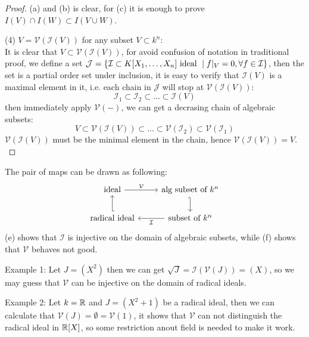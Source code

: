 \begin{proof}
    (a) and (b) is clear, for (c) it is enough to prove \(I(V) \cap I(W) \subset I(V \cup W)\). 

        (4) \(V= \mathcal{V}(\mathcal{I}(V)) \) for any subset \(V \subset k^n\):\\

        It is clear that \(V \subset \mathcal{V}(\mathcal{I}(V))\), for avoid confusion of notation in traditional proof, we define a set \(\mathcal{J}=\{\mathcal{I} \subset K[X_1,\dots,X_n] \\\text{ ideal } \mid f|_V = 0, \forall f \in \mathcal{I}\}\), then the set is a partial order set under inclusion, it is easy to verify that \(\mathcal{I}(V)\) is a maximal element in it, i.e. each chain in \(\mathcal{J}\) will stop at \(\mathcal{V}(\mathcal{I}(V))\):
        \[\mathcal{I}_1 \subset \mathcal{I}_2 \subset \dots \subset \mathcal{I}(V)\]
        then immediately apply \(\mathcal{V}(-)\), we can get a decrasing chain of algebraic subsets:
        \[V \subset \mathcal{V}(\mathcal{I}(V)) \subset \dots \subset \mathcal{V}(\mathcal{I}_2) \subset \mathcal{V}(\mathcal{I}_1)\]
        \(\mathcal{V}(\mathcal{I}(V))\) must be the minimal element in the chain, hence \(\mathcal{V}(\mathcal{I}(V)) = V\).\\
\end{proof}

\begin{remark}
    The pair of maps can be drawn as following:
\[\begin{tikzcd}
	{\text{ideal}} & {\text{alg subset of } k^n} \\
	{\text{radical ideal}} & {\text{subset of } k^n}
	\arrow["{\mathcal{V}}", from=1-1, to=1-2]
	\arrow[hook', from=1-2, to=2-2]
	\arrow[hook', from=2-1, to=1-1]
	\arrow["{\mathcal{I}}", from=2-2, to=2-1]
\end{tikzcd}\]
(e) shows that \(\mathcal{I}\) is injective on the domain of algebraic subsets, while (f) shows that \(\mathcal{V}\) behaves not good.

Example 1: Let \(J = (X^2)\) then we can get \(\sqrt{J} = \mathcal{I}(\mathcal{V}(J))= (X)\), so we may guess that \(\mathcal{V}\) can be injective on the domain of radical ideals.

Example 2: Let \(k = \mathbb{R}\) and \(J = (X^2+1)\) be a radical ideal, then we can calculate that \(\mathcal{V}(J) = \emptyset = \mathcal{V}(1)\), it shows that \(\mathcal{V}\) can not distinguish the radical ideal in \(\mathbb{R}[X]\), so some restriction anout field is needed to make it work.


\end{remark}

